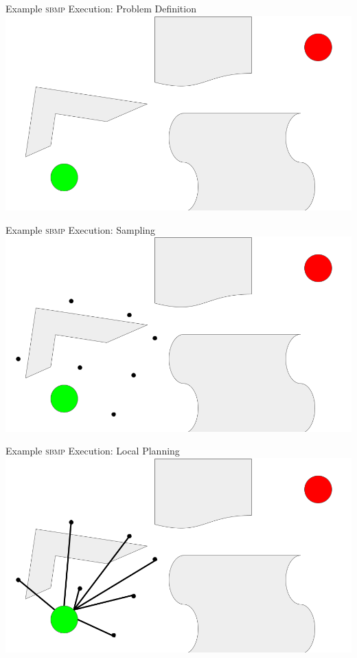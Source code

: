 \documentclass{beamer}
\begin{document}
\begin{frame}{Example \textsc{sbmp} Execution: Problem Definition}
\includegraphics[width=\textwidth]{./assets/rrt_slides/rrt_slides_2.png}
\end{frame}

\begin{frame}{Example \textsc{sbmp} Execution: Sampling}
\includegraphics[width=\textwidth]{./assets/rrt_slides/rrt_slides_3.png}
\end{frame}

\begin{frame}{Example \textsc{sbmp} Execution: Local Planning}
\includegraphics[width=\textwidth]{./assets/rrt_slides/rrt_slides_4.png}
\end{frame}
\end{document}
